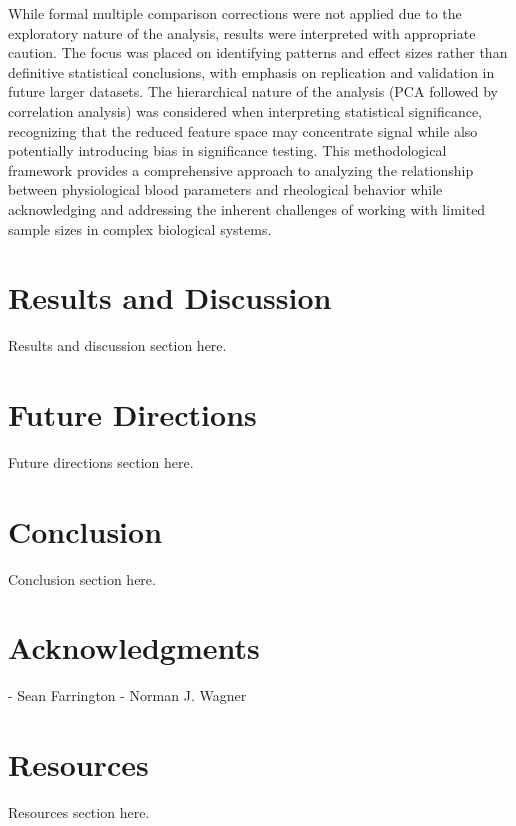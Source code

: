 \documentclass[12pt,letterpaper]{article}
\begin{document}
While formal multiple comparison corrections were not applied due to the exploratory nature of the analysis,
results were interpreted with appropriate caution. The focus was placed on identifying patterns and effect sizes rather than definitive statistical conclusions,
with emphasis on replication and validation in future larger datasets. The hierarchical nature of the analysis (PCA followed by correlation analysis) was considered when
interpreting statistical significance, recognizing that the reduced feature space may concentrate signal while also potentially introducing bias in significance testing.
This methodological framework provides a comprehensive approach to analyzing the relationship between physiological blood parameters and rheological behavior while acknowledging
and addressing the inherent challenges of working with limited sample sizes in complex biological systems.

\newpage
\section{Results and Discussion}
Results and discussion section here.

\newpage
\section{Future Directions}
Future directions section here.

\newpage
\section{Conclusion}
Conclusion section here.

\newpage
\section{Acknowledgments}

- Sean Farrington
- Norman J. Wagner

\newpage
\section{Resources}
Resources section here.

\newpage
\end{document}
